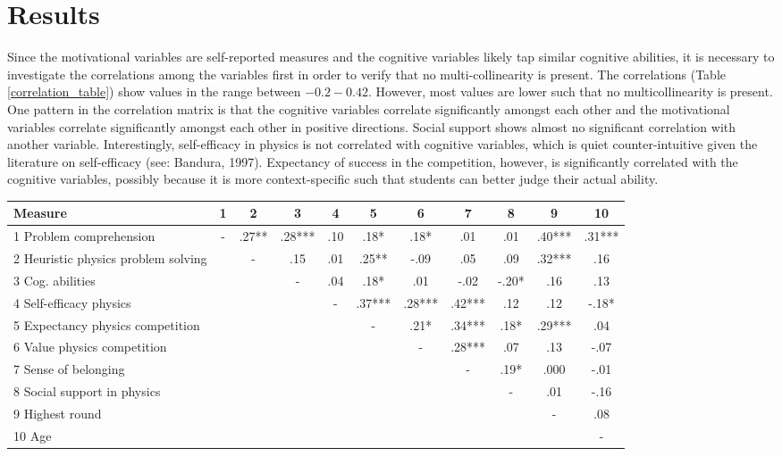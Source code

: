 \documentclass[D:/studies/WinnerS/Erhebungen/IPhO1718/paper/problem_solving/main/TaylorFrancis/interactapasample]{subfiles}
\begin{document}
\section{Results}


Since the motivational variables are self-reported measures and the cognitive variables likely tap similar cognitive abilities, it is necessary to investigate the correlations among the variables first in order to verify that no multi-collinearity is present. The correlations (Table \ref{correlation_table}) show values in the range between $-0.2-0.42$. However, most values are lower such that no multicollinearity is present. One pattern in the correlation matrix is that the cognitive variables correlate significantly amongst each other and the motivational variables correlate significantly amongst each other in positive directions. Social support shows almost no significant correlation with another variable. Interestingly, self-efficacy in physics is not correlated with cognitive variables, which is quiet counter-intuitive given the literature on self-efficacy (see: Bandura, 1997). Expectancy of success in the competition, however, is significantly correlated with the cognitive variables, possibly because it is more context-specific such that students can better judge their actual ability.

\begin{sidewaystable}
\caption{Correlations among measured variables.}
\label{correlation_table}
\begin{tabular}{lcccccccccc}
  \toprule
Measure & 1 & 2 & 3 & 4 & 5 & 6 & 7 & 8 & 9 & 10 \\ 
  \midrule
1 Problem comprehension & - & .27** & .28*** & .10 & .18* & .18* & .01 & .01 & .40*** & .31*** \\ 
  2 Heuristic physics problem solving &  & - & .15 & .01 & .25** & -.09 & .05 & .09 & .32*** & .16 \\ 
  3 Cog. abilities &  &  & - & .04 & .18* & .01 & -.02 & -.20* & .16 & .13 \\ 
  4 Self-efficacy physics &  &  &  & - & .37*** & .28*** & .42*** & .12 & .12 & -.18* \\ 
  5 Expectancy physics competition &  &  &  &  & - & .21* & .34*** & .18* & .29*** & .04 \\ 
  6 Value physics competition &  &  &  &  &  & - & .28*** & .07 & .13 & -.07 \\ 
  7 Sense of belonging &  &  &  &  &  &  & - & .19* & .000 & -.01 \\ 
  8 Social support in physics &  &  &  &  &  &  &  & - & .01 & -.16 \\ 
  9 Highest round &  &  &  &  &  &  &  &  & - & .08 \\ 
  10 Age &  &  &  &  &  &  &  &  &  & - \\ 
   \bottomrule
\end{tabular}\end{sidewaystable}
\end{document}
